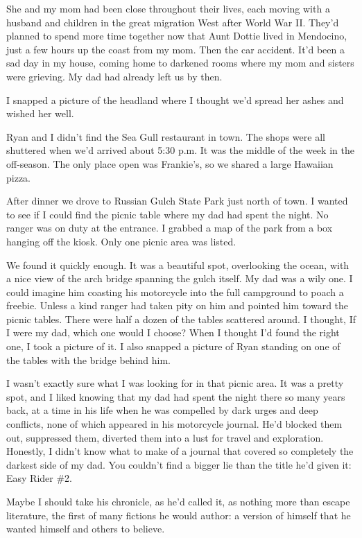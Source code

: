 \documentclass[12pt]{book}
\begin{document}
She and my mom had been close throughout their lives, each moving with a husband and children in the great migration West after World War II. They'd planned to spend more time together now that Aunt Dottie lived in Mendocino, just a few hours up the coast from my mom. Then the car accident. It'd been a sad day in my house, coming home to darkened rooms where my mom and sisters were grieving. My dad had already left us by then.

I snapped a picture of the headland where I thought we'd spread her ashes and wished her well.

Ryan and I didn't find the Sea Gull restaurant in town. The shops were all shuttered when we'd arrived about 5:30 p.m. It was the middle of the week in the off-season. The only place open was Frankie's, so we shared a large Hawaiian pizza.

After dinner we drove to Russian Gulch State Park just north of town. I wanted to see if I could find the picnic table where my dad had spent the night. No ranger was on duty at the entrance. I grabbed a map of the park from a box hanging off the kiosk. Only one picnic area was listed.

We found it quickly enough. It was a beautiful spot, overlooking the ocean, with a nice view of the arch bridge spanning the gulch itself. My dad was a wily one. I could imagine him coasting his motorcycle into the full campground to poach a freebie. Unless a kind ranger had taken pity on him and pointed him toward the picnic tables. There were half a dozen of the tables scattered around. I thought, If I were my dad, which one would I choose? When I thought I'd found the right one, I took a picture of it. I also snapped a picture of Ryan standing on one of the tables with the bridge behind him.

I wasn't exactly sure what I was looking for in that picnic area. It was a pretty spot, and I liked knowing that my dad had spent the night there so many years back, at a time in his life when he was compelled by dark urges and deep conflicts, none of which appeared in his motorcycle journal. He'd blocked them out, suppressed them, diverted them into a lust for travel and exploration. Honestly, I didn't know what to make of a journal that covered so completely the darkest side of my dad. You couldn't find a bigger lie than the title he'd given it: Easy Rider \#2.

Maybe I should take his chronicle, as he'd called it, as nothing more than escape literature, the first of many fictions he would author: a version of himself that he wanted himself and others to believe.
\end{document}
